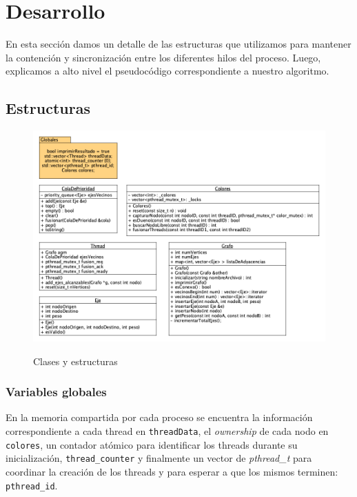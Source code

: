 \section{Desarrollo}

En esta sección damos un detalle de las estructuras que utilizamos para mantener la contención y sincronización entre los diferentes hilos del proceso. Luego, explicamos a alto nivel el pseudocódigo correspondiente a nuestro algoritmo.

\subsection{Estructuras}

\begin{figure}[h]
    \centering
    \includegraphics[width=1\textwidth]{imagenes/tp1.png} \\%
    \caption{Clases y estructuras}
    \label{fig:uml}
\end{figure}

\subsubsection{Variables globales}

En la memoria compartida por cada proceso se encuentra la información correspondiente a cada thread en \texttt{threadData}, el \textit{ownership} de cada nodo en \texttt{colores}, un contador atómico para identificar los threads durante su inicialización, \texttt{thread_counter} y finalmente un vector de \textit{pthread_t} para coordinar la creación de los threads y para esperar a que los mismos terminen: \texttt{pthread_id}.


